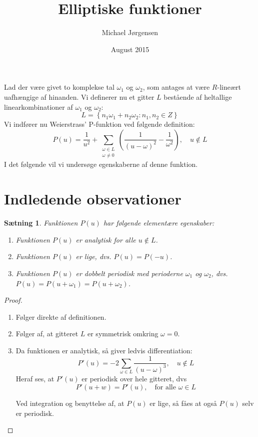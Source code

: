 \documentclass[12pt,oneside,a4paper]{article}
\title{Elliptiske funktioner}
\date{August 2015}
\author{Michael Jørgensen}
\newcommand{\be}{\begin{equation}}
\newcommand{\ee}{\end{equation}}
\newtheorem{thm}{Sætning}[section]
\begin{document}
\maketitle

Lad der være givet to komplekse tal $\omega_1$ og $\omega_2$, som antages
at være $R$-lineært uafhængige af hinanden. Vi definerer nu et gitter
$L$ bestående af heltallige linearkombinationer af $\omega_1$ og $\omega_2$:
\be
L = \left\{ n_1 \omega_1 + n_2 \omega_2 : n_1, n_2 \in Z\right\}
\ee
Vi indfører nu Weierstrass' P-funktion ved følgende definition:
\be
P(u) = \frac{1}{u^2} + \sum_{\substack{\omega\in L\\ \omega \neq 0}}
  \left(\frac{1}{(u-\omega)^2} - \frac{1}{\omega^2}\right),
  \quad u\not\in L
  \label{pu}
\ee
I det følgende vil vi undersøge egenskaberne af denne funktion.

\section{Indledende observationer}
\begin{thm}
    Funktionen $P(u)$ har følgende elementære egenskaber:
    \begin{enumerate}
        \item Funktionen $P(u)$ er analytisk for alle $u \not\in L$. 
        \item Funktionen $P(u)$ er lige, dvs. $P(u) = P(-u)$.
        \item Funktionen $P(u)$ er dobbelt periodisk med perioderne $\omega_1$ og $\omega_2$, dvs. $P(u) = P(u+\omega_1) = P(u+\omega_2)$.
    \end{enumerate}
\end{thm}
\begin{proof}
    \begin{enumerate}
        \item Følger direkte af definitionen.
        \item Følger af, at gitteret $L$ er symmetrisk omkring $\omega=0$.
        \item Da funktionen er analytisk, så giver ledvis differentiation:
\be
P'(u) = -2 \sum_{\omega\in L} \frac{1}{(u-\omega)^3}, \quad u\not\in L
\ee
Heraf ses, at $P'(u)$ er periodisk over hele gitteret, dvs
\be
P'(u+w) = P'(u),\quad \mbox{for alle $\omega\in L$}
\ee

Ved integration og benyttelse af, at $P(u)$ er lige, så fåes at også 
$P(u)$ selv er periodisk.
    \end{enumerate}
\end{proof}
\end{document}
